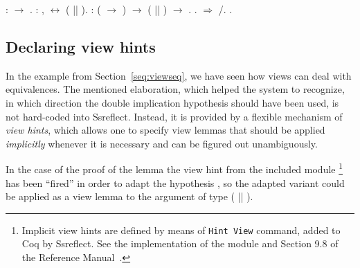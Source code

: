\begin{coqdoccode}
\coqdocemptyline
\coqdocnoindent
{}  :  \ensuremath{\rightarrow} .\coqdoceol
\coqdocnoindent
{}  : \coqdockw{\ensuremath{\forall}}  ,   \ensuremath{\leftrightarrow}  ( || ).\coqdoceol
\coqdocemptyline
\coqdocnoindent
{}   : (  \ensuremath{\rightarrow} ) \ensuremath{\rightarrow}  ( || ) \ensuremath{\rightarrow} .\coqdoceol
\coqdocnoindent
{}.\coqdoceol
\coqdocnoindent
{} \ensuremath{\Rightarrow} /.\coqdoceol
\coqdocnoindent
{}.\coqdoceol
\coqdocemptyline
\end{coqdoccode}


\subsection{Declaring view hints}




In the example from Section~\ref{seq:viewseq}, we have seen how
views can deal with equivalences. The mentioned elaboration, which
helped the system to recognize, in which direction the double
implication hypothesis  should have been used, is not
hard-coded into Ssreflect. Instead, it is provided by a flexible
mechanism of  \textit{view hints}, which allows one to
specify view lemmas that should be applied \textit{implicitly} whenever it is
necessary and can be figured out unambiguously.


In the case of the proof of the  lemma the view hint 
from the included module \footnote{Implicit view hints are
defined by means of \texttt{Hint View} command, added
to Coq by Ssreflect. See the implementation of the module
 and Section 9.8 of the Reference
Manual~\cite{Gontier-al:TR}.}  has been ``fired'' in
order to adapt the hypothesis , so the adapted variant could
be applied as a view lemma to the argument of type  ( || ).


